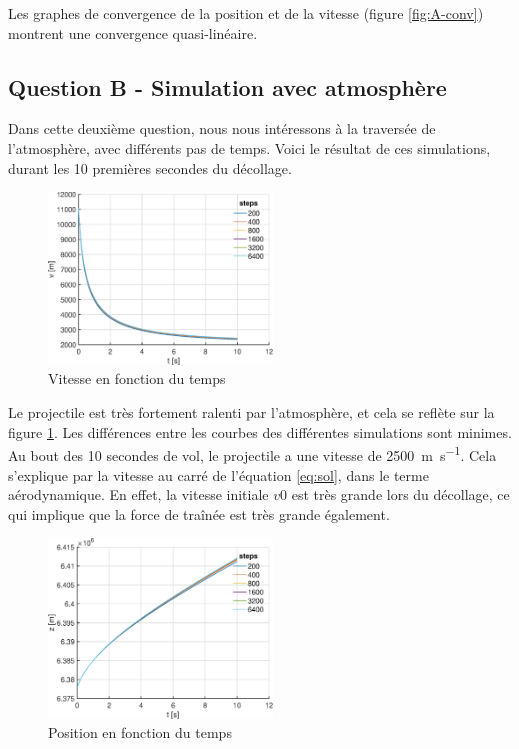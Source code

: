 \documentclass[a4paper,12pt,twoside]{article}
\begin{document}
Les graphes de convergence de la position et de la vitesse (figure \ref{fig:A-conv}) montrent une convergence quasi-linéaire. 

\subsection{Question B - Simulation avec atmosphère}
Dans cette deuxième question, nous nous intéressons à la traversée de l'atmosphère, avec différents pas de temps.
Voici le résultat de ces simulations, durant les 10 premières secondes du décollage.\\

\begin{figure}[h]
	\centering
    \includegraphics[width=0.53\textwidth]{graphs/vB.eps}
    \caption{Vitesse en fonction du temps}
    \label{fig:B-vt}
\end{figure}

Le projectile est très fortement ralenti par l'atmosphère, et cela se reflète sur la figure \ref{fig:B-vt}.
Les différences entre les courbes des différentes simulations sont minimes.
Au bout des 10 secondes de vol, le projectile a une vitesse de \SI{2500}{\meter\per\second}.
Cela s'explique par la vitesse au carré de l'équation \ref{eq:sol}, dans le terme aérodynamique.
En effet, la vitesse initiale $v0$ est très grande lors du décollage, ce qui implique que la force de traînée est très grande également.\\


\begin{figure}[h]
	\centering
	\includegraphics[width=0.53\textwidth]{graphs/zB.eps}
	\caption{Position en fonction du temps}
	\label{fig:B-zt}
\end{figure}
\end{document}
